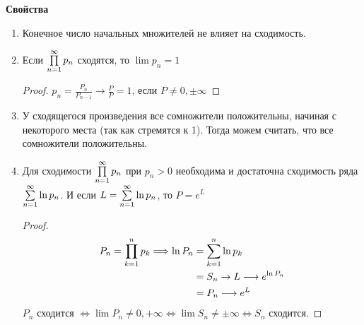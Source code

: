 \textbf{Свойства}
\begin{enumerate}
    \item Конечное число начальных множителей не влияет на сходимость.
    \item Если $\prod \limits_{n=1}^\infty p_n$ сходятся, то $\lim p_n = 1$
    \begin{proof}
        $p_n = \frac{P_n}{P_{n-1}} \to \frac{P}{P} = 1$, если $P \neq 0, \pm \infty$
    \end{proof}
    \item У сходящегося произведения все сомножители положительны, начиная с некоторого места (так как стремятся к 1). Тогда можем считать, что все сомножители положительны.
    \item Для сходимости $\prod \limits_{n=1}^\infty p_n$ при $p_n > 0$ необходима и достаточна сходимость ряда $\sum \limits_{n=1}^\infty \ln p_n$.
    И если $L = \sum \limits_{n=1}^\infty \ln p_n$, то $P = e^L$
    \begin{proof}
        \begin{align*}
            P_n = \prod \limits_{k=1}^n p_k \Longrightarrow \ln P_n &= \sum \limits_{k=1}^n \ln p_k \\
            &= S_n \to L \longrightarrow e^{\ln P_n} \\
            &= P_n \longrightarrow e^L
        \end{align*}
        $P_n$ сходится $\Longleftrightarrow \lim P_n \neq 0, +\infty \Longleftrightarrow \lim S_n \neq \pm \infty \Longleftrightarrow S_n$ сходится.
    \end{proof}
\end{enumerate}